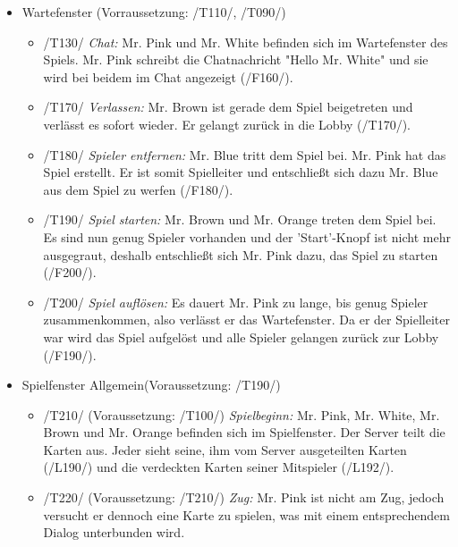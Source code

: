 \documentclass{article}
\begin{document}
\begin{itemize}
\begin{itemize}
	\end{itemize}
	
	\item Wartefenster (Vorraussetzung: /T110/, /T090/)
	
	\begin{itemize}
		
		\item /T130/ \textit{Chat:} Mr. Pink und Mr. White befinden sich im Wartefenster des Spiels. Mr. Pink schreibt die Chatnachricht "Hello Mr. White" und sie wird bei beidem im Chat angezeigt (/F160/).
		
		\item /T170/ \textit{Verlassen:} Mr. Brown ist gerade dem Spiel beigetreten und verlässt es sofort wieder. Er gelangt zurück in die Lobby (/T170/).
		
		\item /T180/ \textit{Spieler entfernen:} Mr. Blue tritt dem Spiel bei. Mr. Pink hat das Spiel erstellt. Er ist somit Spielleiter und entschließt sich dazu Mr. Blue aus dem Spiel zu werfen (/F180/). 
		
		\item /T190/ \textit{Spiel starten:} Mr. Brown und Mr. Orange treten dem Spiel bei. Es sind nun genug Spieler vorhanden und der 'Start'-Knopf ist nicht mehr ausgegraut, deshalb entschließt sich Mr. Pink dazu, das Spiel zu starten (/F200/).
		
		\item /T200/ \textit{Spiel auflösen:} Es dauert Mr. Pink zu lange, bis genug Spieler zusammenkommen, also verlässt er das Wartefenster. Da er der Spielleiter war wird das Spiel aufgelöst und alle Spieler gelangen zurück zur Lobby (/F190/).
		 
	\end{itemize}

	\item Spielfenster Allgemein(Voraussetzung: /T190/)
	
	\begin{itemize}
	
		\item /T210/ (Voraussetzung: /T100/) \textit{Spielbeginn:} Mr. Pink, Mr. White, Mr. Brown und Mr. Orange befinden sich im Spielfenster. Der Server teilt die Karten aus. Jeder sieht seine, ihm vom Server ausgeteilten Karten (/L190/) und die verdeckten Karten seiner Mitspieler (/L192/).  

		\item /T220/ (Voraussetzung: /T210/) \textit{Zug:} Mr. Pink ist nicht am Zug, jedoch versucht er dennoch eine Karte zu spielen, was mit einem entsprechendem Dialog  unterbunden wird.
		

\end{itemize}
\end{itemize}
\end{document}
